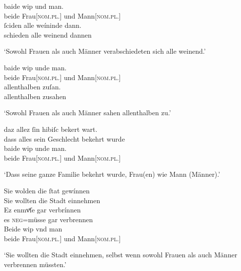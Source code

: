\begin{exe}
\ex \label{ex:konjmixbeide2}
	\begin{xlist}
	\ex \label{ex:konjmixbeide2_1}
		\gll baide wip und man. \\
			beide Frau[\textsc{nom.pl.\NeutF}] und Mann[\textsc{nom.pl.\MascM}] \\ %
	\sn \gll ſciden alle weíninde dann. \\
			schieden alle weinend dannen \\
		\begin{taggedline}{\parencites[\pno~7ra,38--39]{kc:A1}[vgl.][1564--1565]{schroeder1895}}
		\trans `Sowohl Frauen als auch Männer verabschiedeten sich alle
			weinend.'
		\end{taggedline}

	\ex \label{ex:konjmixbeide2_2}
		\gll baide wip unde man. \\
			beide Frau[\textsc{nom.pl.\NeutF}] und Mann[\textsc{nom.pl.\MascM}] \\ %
	\sn \gll allenthalben zuſan. \\
			allenthalben zusahen \\
		\begin{taggedline}{\parencites[\pno~58va,44--45]{kc:A1}[vgl.][13573--13574]{schroeder1895}}
		\trans `Sowohl Frauen als auch Männer sahen allenthalben zu.'
		\end{taggedline}

	\ex \label{ex:konjmixbeide2_3}
		\gll daz allez ſin hibiſc bekert wart. \\
			dass alles sein Geschlecht bekehrt wurde \\
	\sn \gll baide wip unde man. \\
			beide Frau[\textsc{nom.pl.\NeutF}] und Mann[\textsc{nom.pl.\MascM}] \\
		\begin{taggedline}{\parencites[\pno~27va,9--11]{kc:A1}[6360--6361]{schroeder1895}}
		\trans `Dass seine ganze Familie bekehrt wurde, Frau(en) wie Mann (Männer).'
		\end{taggedline}

	\ex \label{ex:konjmixbeide2_4}
		\gll Sie wolden die ſtat gewínnen \\
			Sie wollten die Stadt einnehmen \\
	\sn \gll Ez enmvͤſe gar verbrínnen \\
			es \textsc{neg}=müsse gar verbrennen \\
	\sn \gll Beide wip vnd man \\
			beide Frau[\textsc{nom.pl.\NeutF}] und Mann[\textsc{nom.pl.\MascM}] \\
		\begin{taggedline}{\parencites[\pno~21vb,7--8]{kc:VB}[vgl.~abweichend][4379--4381]{schroeder1895}}
		\trans `Sie wollten die Stadt einnehmen, selbst wenn
		sowohl Frauen als auch Männer  verbrennen müssten.'
		\end{taggedline}
	\end{xlist}
\end{exe}


